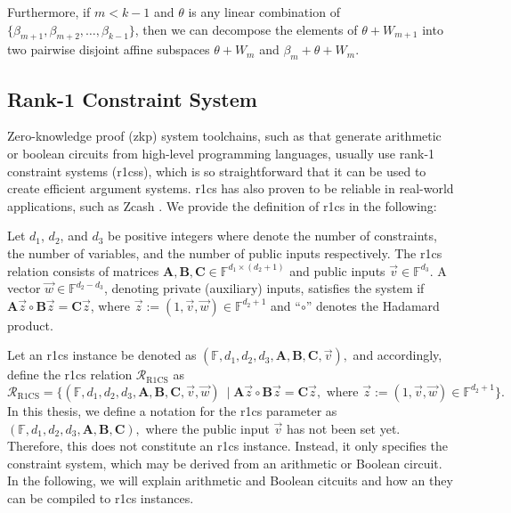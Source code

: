 Furthermore, if $m < k-1$ and $\theta$ is any linear combination of $\{\beta_{m+1}, \beta_{m+2}, \ldots, \beta_{k-1}\}$, then we can decompose the elements of $\theta + W_{m+1}$ into two pairwise disjoint affine subspaces $\theta + W_m$ and $\beta_{m} + \theta + W_m$.

\subsection{Rank-1 Constraint System}

Zero-knowledge proof (\gls{zkp}) system toolchains, such as \cite{Groth2016, Aurora2019, Chiesa2020Fractal, Ames2017Ligero} that generate arithmetic or boolean circuits from high-level programming languages, usually use rank-1 constraint systems (\gls{r1cs}s), which is so straightforward that it can be used to create efficient argument systems. \gls{r1cs} has also proven to be reliable in real-world applications, such as Zcash \cite{zcash-proc}. We provide the definition of \gls{r1cs} in the following:

\begin{definition} \label{def:R1CS}
	Let $d_1$, $d_2$, and $d_3$ be positive integers where denote the number of constraints, the number of variables, and the number of public inputs respectively. The \gls{r1cs} relation consists of matrices $\mathbf{A},\mathbf{B},\mathbf{C} \in \mathbb{F}^{d_1\times (d_2+1)}$ and public inputs $\vec{{v}} \in \mathbb{F}^{d_3}$. A vector $\vec{{w}} \in \mathbb{F}^{d_2-d_3}$, denoting private (auxiliary) inputs, satisfies the system if
	\(
	\mathbf{A}\vec{{z}} \circ \mathbf{B}\vec{{z}} = \mathbf{C}\vec{{z}}
	\), 
	where $\vec{z}:=(1,\vec{v},\vec{w}) \in \mathbb{F}^{d_2+1}$ and “$\circ$” denotes the Hadamard product.
\end{definition}
Let an \gls{r1cs} instance be denoted as 
\(
(\mathbb{F}, d_1, d_2, d_3, \mathbf{A}, \mathbf{B}, \mathbf{C}, \vec{v}),
\)
and accordingly, define the \gls{r1cs} relation $\mathcal{R}_{\text{R1CS}}$ as   
\[
\mathcal{R}_{\text{R1CS}} = \{(\mathbb{F}, d_1, d_2, d_3, \mathbf{A}, \mathbf{B}, \mathbf{C}, \vec{v}, \vec{w})\ \mid  \mathbf{A}\vec{{z}} \circ \mathbf{B}\vec{{z}} = \mathbf{C}\vec{{z}}, \text{ where } \vec{z}:=(1,\vec{v},\vec{w}) \in \mathbb{F}^{d_2+1}\}.
\]
In this thesis, we define a notation for the \gls{r1cs} parameter as 
\(
(\mathbb{F}, d_1, d_2, d_3, \mathbf{A}, \mathbf{B}, \mathbf{C}),
\)
where the public input \(\vec{v}\) has not been set yet. Therefore, this does not constitute an \gls{r1cs} instance. Instead, it only specifies the constraint system, which may be derived from an arithmetic or Boolean circuit. In the following, we will explain arithmetic and Boolean citcuits and how an they can be compiled to \gls{r1cs} instances.


